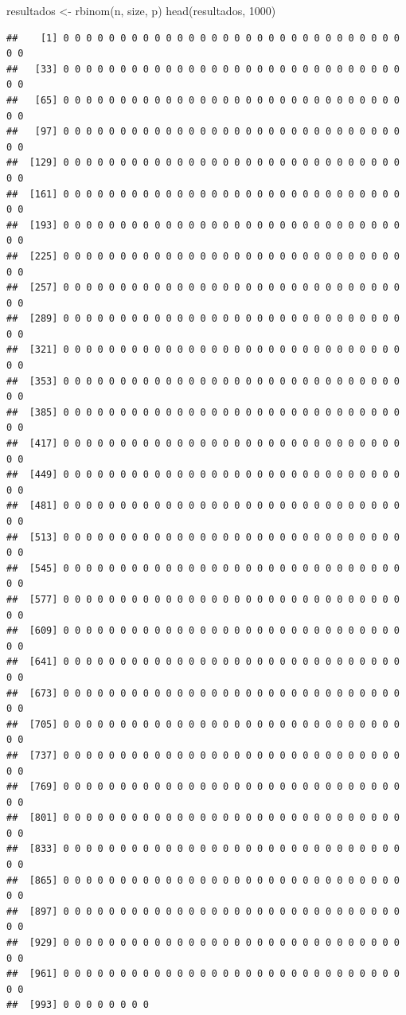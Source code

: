 \documentclass[
  11pt]{report}
\newenvironment{Shaded}{\begin{snugshade}}{\end{snugshade}}
\newcommand{\DecValTok}[1]{\textcolor[rgb]{0.00,0.00,0.81}{#1}}
\newcommand{\FunctionTok}[1]{\textcolor[rgb]{0.00,0.00,0.00}{#1}}
\newcommand{\NormalTok}[1]{#1}
\newcommand{\OtherTok}[1]{\textcolor[rgb]{0.56,0.35,0.01}{#1}}
\renewenvironment{Shaded}{
    \begin{mdframed}[%
      roundcorner=2pt,%
      innerleftmargin=5pt,%
      innerrightmargin=5pt,%
      topline=true,%
      leftline=true,%
      rightline=true,%
      bottomline=true,%
      linewidth=0.5pt,%
      linecolor=black!20,%
      backgroundcolor=black!2,%
      skipabove=2ex,%
      skipbelow=2.5ex%
    ]%
  }
  {
    \end{mdframed}
  }
\begin{document}
\begin{itemize}
\begin{Shaded}
\begin{Highlighting}[]
\NormalTok{resultados }\OtherTok{\textless{}{-}} \FunctionTok{rbinom}\NormalTok{(n, size, p)}
\FunctionTok{head}\NormalTok{(resultados, }\DecValTok{1000}\NormalTok{)}
\end{Highlighting}
\end{Shaded}

\begin{verbatim}
##    [1] 0 0 0 0 0 0 0 0 0 0 0 0 0 0 0 0 0 0 0 0 0 0 0 0 0 0 0 0 0 0 0 0
##   [33] 0 0 0 0 0 0 0 0 0 0 0 0 0 0 0 0 0 0 0 0 0 0 0 0 0 0 0 0 0 0 0 0
##   [65] 0 0 0 0 0 0 0 0 0 0 0 0 0 0 0 0 0 0 0 0 0 0 0 0 0 0 0 0 0 0 0 0
##   [97] 0 0 0 0 0 0 0 0 0 0 0 0 0 0 0 0 0 0 0 0 0 0 0 0 0 0 0 0 0 0 0 0
##  [129] 0 0 0 0 0 0 0 0 0 0 0 0 0 0 0 0 0 0 0 0 0 0 0 0 0 0 0 0 0 0 0 0
##  [161] 0 0 0 0 0 0 0 0 0 0 0 0 0 0 0 0 0 0 0 0 0 0 0 0 0 0 0 0 0 0 0 0
##  [193] 0 0 0 0 0 0 0 0 0 0 0 0 0 0 0 0 0 0 0 0 0 0 0 0 0 0 0 0 0 0 0 0
##  [225] 0 0 0 0 0 0 0 0 0 0 0 0 0 0 0 0 0 0 0 0 0 0 0 0 0 0 0 0 0 0 0 0
##  [257] 0 0 0 0 0 0 0 0 0 0 0 0 0 0 0 0 0 0 0 0 0 0 0 0 0 0 0 0 0 0 0 0
##  [289] 0 0 0 0 0 0 0 0 0 0 0 0 0 0 0 0 0 0 0 0 0 0 0 0 0 0 0 0 0 0 0 0
##  [321] 0 0 0 0 0 0 0 0 0 0 0 0 0 0 0 0 0 0 0 0 0 0 0 0 0 0 0 0 0 0 0 0
##  [353] 0 0 0 0 0 0 0 0 0 0 0 0 0 0 0 0 0 0 0 0 0 0 0 0 0 0 0 0 0 0 0 0
##  [385] 0 0 0 0 0 0 0 0 0 0 0 0 0 0 0 0 0 0 0 0 0 0 0 0 0 0 0 0 0 0 0 0
##  [417] 0 0 0 0 0 0 0 0 0 0 0 0 0 0 0 0 0 0 0 0 0 0 0 0 0 0 0 0 0 0 0 0
##  [449] 0 0 0 0 0 0 0 0 0 0 0 0 0 0 0 0 0 0 0 0 0 0 0 0 0 0 0 0 0 0 0 0
##  [481] 0 0 0 0 0 0 0 0 0 0 0 0 0 0 0 0 0 0 0 0 0 0 0 0 0 0 0 0 0 0 0 0
##  [513] 0 0 0 0 0 0 0 0 0 0 0 0 0 0 0 0 0 0 0 0 0 0 0 0 0 0 0 0 0 0 0 0
##  [545] 0 0 0 0 0 0 0 0 0 0 0 0 0 0 0 0 0 0 0 0 0 0 0 0 0 0 0 0 0 0 0 0
##  [577] 0 0 0 0 0 0 0 0 0 0 0 0 0 0 0 0 0 0 0 0 0 0 0 0 0 0 0 0 0 0 0 0
##  [609] 0 0 0 0 0 0 0 0 0 0 0 0 0 0 0 0 0 0 0 0 0 0 0 0 0 0 0 0 0 0 0 0
##  [641] 0 0 0 0 0 0 0 0 0 0 0 0 0 0 0 0 0 0 0 0 0 0 0 0 0 0 0 0 0 0 0 0
##  [673] 0 0 0 0 0 0 0 0 0 0 0 0 0 0 0 0 0 0 0 0 0 0 0 0 0 0 0 0 0 0 0 0
##  [705] 0 0 0 0 0 0 0 0 0 0 0 0 0 0 0 0 0 0 0 0 0 0 0 0 0 0 0 0 0 0 0 0
##  [737] 0 0 0 0 0 0 0 0 0 0 0 0 0 0 0 0 0 0 0 0 0 0 0 0 0 0 0 0 0 0 0 0
##  [769] 0 0 0 0 0 0 0 0 0 0 0 0 0 0 0 0 0 0 0 0 0 0 0 0 0 0 0 0 0 0 0 0
##  [801] 0 0 0 0 0 0 0 0 0 0 0 0 0 0 0 0 0 0 0 0 0 0 0 0 0 0 0 0 0 0 0 0
##  [833] 0 0 0 0 0 0 0 0 0 0 0 0 0 0 0 0 0 0 0 0 0 0 0 0 0 0 0 0 0 0 0 0
##  [865] 0 0 0 0 0 0 0 0 0 0 0 0 0 0 0 0 0 0 0 0 0 0 0 0 0 0 0 0 0 0 0 0
##  [897] 0 0 0 0 0 0 0 0 0 0 0 0 0 0 0 0 0 0 0 0 0 0 0 0 0 0 0 0 0 0 0 0
##  [929] 0 0 0 0 0 0 0 0 0 0 0 0 0 0 0 0 0 0 0 0 0 0 0 0 0 0 0 0 0 0 0 0
##  [961] 0 0 0 0 0 0 0 0 0 0 0 0 0 0 0 0 0 0 0 0 0 0 0 0 0 0 0 0 0 0 0 0
##  [993] 0 0 0 0 0 0 0 0
\end{verbatim}


\end{itemize}
\end{document}
